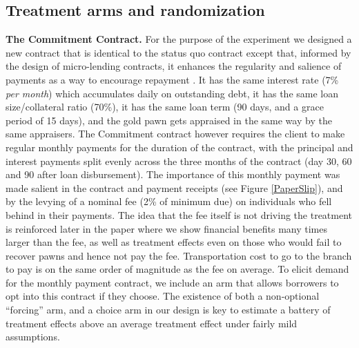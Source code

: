 \documentclass[oneside,11pt]{article}
\begin{document}
\subsection{Treatment arms and randomization}

\noindent \textbf{The Commitment Contract.} For the purpose of the experiment we designed a new contract that is identical to the status quo contract except that, informed by the design of micro-lending contracts, it enhances the regularity and salience of payments as a way to encourage repayment \citep{morduch1999microfinance, bauer2012behavioral}.  It has the same interest rate (7\% \textit{per month}) which accumulates daily on outstanding debt, it has the same loan size/collateral ratio (70\%), it has the same loan term (90 days, and a grace period of 15 days), and the gold pawn gets appraised in the same way by the same appraisers. The Commitment contract however requires the client to make regular monthly payments for the duration of the contract, with the principal and interest payments split evenly across the three months of the contract (day 30, 60 and 90 after loan disbursement). The importance of this monthly payment was made salient in the contract and payment receipts (see Figure \ref{PaperSlip}), and by the levying of a nominal fee (2\% of minimum due) on individuals who fell behind in their payments.  The idea that the fee itself is not driving the treatment is reinforced later in the paper where we show financial benefits many times larger than the fee, as well as treatment effects even on those who would fail to recover pawns and hence not pay the fee. Transportation cost to go to the branch to pay is on the same order of magnitude as the fee on average.
To elicit demand for the monthly payment contract, we include an arm that allows borrowers to opt into this contract if they choose. The existence of both a non-optional ``forcing'' arm, and a choice arm in our design is key to estimate a battery of treatment effects above an average treatment effect under fairly mild assumptions.
\end{document}
